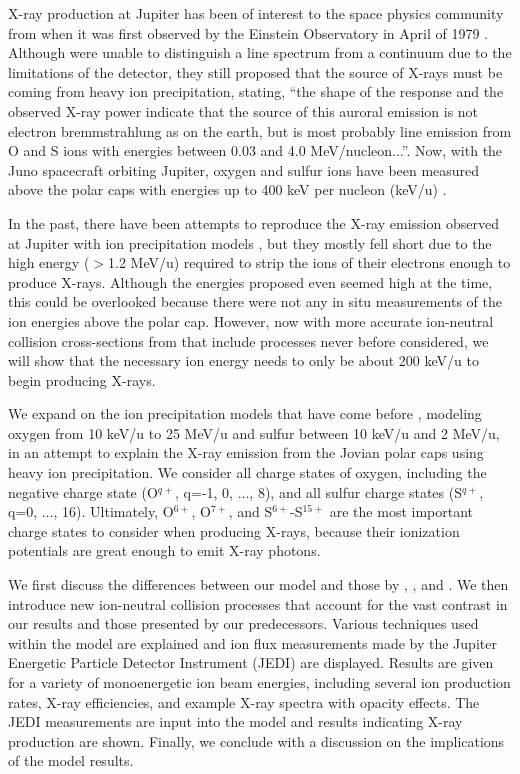 \documentclass[draft]{agujournal2018}
\begin{document}
X-ray production at Jupiter has been of interest to the space physics community from when it was first observed by the Einstein Observatory in April of 1979 \citep{metzger1983}.
Although \citet{metzger1983} were unable to distinguish a line spectrum from a continuum due to the limitations of the detector, they still proposed that the source of X-rays must be coming from heavy ion precipitation, stating, ``the shape of the response and the observed X-ray power indicate that the source of this auroral emission is not electron bremmstrahlung as on the earth, but is most probably line emission from O and S ions with energies between 0.03 and 4.0 MeV/nucleon...''.
Now, with the Juno spacecraft orbiting Jupiter, oxygen and sulfur ions have been measured above the polar caps with energies up to 400 keV per nucleon (keV/u) \citep{haggerty2017,clark2017a,clark2017b}.

In the past, there have been attempts to reproduce the X-ray emission observed at Jupiter with ion precipitation models \citep{cravens1995,ozak2010,ozak2013}, but they mostly fell short due to the high energy ($>$1.2 MeV/u) required to strip the ions of their electrons enough to produce X-rays.
Although the energies proposed even seemed high at the time, this could be overlooked because there were not any in situ measurements of the ion energies above the polar cap.
However, now with more accurate ion-neutral collision cross-sections from \citet{schultz2018} that include processes never before considered, we will show that the necessary ion energy needs to only be about 200 keV/u to begin producing X-rays.

We expand on the ion precipitation models that have come before \citep{cravens1995,ozak2010,ozak2013,houston2018}, modeling oxygen from 10 keV/u to 25 MeV/u and sulfur between 10 keV/u and 2 MeV/u, in an attempt to explain the X-ray emission from the Jovian polar caps using heavy ion precipitation.
We consider all charge states of oxygen, including the negative charge state (O$^{q+}$, q=-1, 0, ..., 8), and all sulfur charge states (S$^{q+}$, q=0, ..., 16).
Ultimately, O$^{6+}$, O$^{7+}$, and S$^{6+}$-S$^{15+}$ are the most important charge states to consider when producing X-rays, because their ionization potentials are great enough to emit X-ray photons.

We first discuss the differences between our model and those by \citet{ozak2010}, \citet{ozak2012}, and \citet{houston2018}.
We then introduce new ion-neutral collision processes that account for the vast contrast in our results and those presented by our predecessors.
Various techniques used within the model are explained and ion flux measurements made by the Jupiter Energetic Particle Detector Instrument (JEDI) \citep{mauk2017ssr} are displayed.
Results are given for a variety of monoenergetic ion beam energies, including several ion production rates, X-ray efficiencies, and example X-ray spectra with opacity effects.
The JEDI measurements are input into the model and results indicating X-ray production are shown.
Finally, we conclude with a discussion on the implications of the model results.
\end{document}
